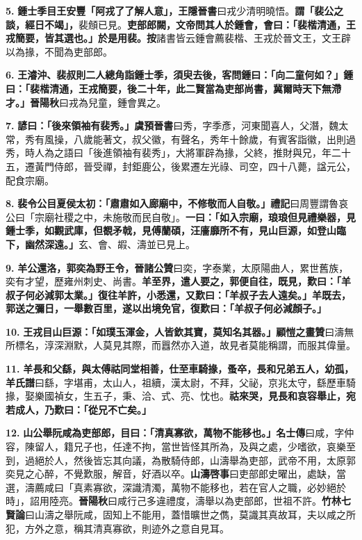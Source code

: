 \textbf{5.} \textbf{鍾士季目王安豐「阿戎了了解人意」，}{\footnotesize \textbf{王隱晉書}曰戎少清明曉悟。}\textbf{謂「裴公之談，經日不竭」，}{\footnotesize 裴頠已見。}\textbf{吏部郎闕，文帝問其人於鍾會，會曰：「裴楷清通，王戎簡要，皆其選也。」於是用裴。}{\footnotesize \textbf{按}諸書皆云鍾會薦裴楷、王戎於晉文王，文王辟以為掾，不聞為吏部郎。}

\textbf{6.} \textbf{王濬沖、裴叔則二人總角詣鍾士季，須臾去後，客問鍾曰：「向二童何如？」鍾曰：「裴楷清通，王戎簡要，後二十年，此二賢當為吏部尚書，冀爾時天下無滯才。」}{\footnotesize \textbf{晉陽秋}曰戎為兒童，鍾會異之。}

\textbf{7.} \textbf{諺曰：「後來領袖有裴秀。」}{\footnotesize \textbf{虞預晉書}曰秀，字季彥，河東聞喜人，父潛，魏太常，秀有風操，八歲能著文，叔父徽，有聲名，秀年十餘歲，有賓客詣徽，出則過秀，時人為之語曰「後進領袖有裴秀」，大將軍辟為掾，父終，推財與兄，年二十五，遷黃門侍郎，晉受禪，封鉅鹿公，後累遷左光祿、司空，四十八薨，諡元公，配食宗廟。}

\textbf{8.} \textbf{裴令公目夏侯太初：「肅肅如入廊廟中，不修敬而人自敬。」}{\footnotesize \textbf{禮記}曰周豐謂魯哀公曰「宗廟社稷之中，未施敬而民自敬」。}\textbf{一曰：「如入宗廟，琅琅但見禮樂器，見鍾士季，如觀武庫，但覩矛戟，見傅蘭碩，汪廧靡所不有，見山巨源，如登山臨下，幽然深遠。」}{\footnotesize 玄、會、嘏、濤並已見上。}

\textbf{9.} \textbf{羊公還洛，郭奕為野王令，}{\footnotesize \textbf{晉諸公贊}曰奕，字泰業，太原陽曲人，累世舊族，奕有才望，歷雍州刺史、尚書。}\textbf{羊至界，遣人要之，郭便自往，既見，歎曰：「羊叔子何必減郭太業。」復往羊許，小悉還，又歎曰：「羊叔子去人遠矣。」羊既去，郭送之彌日，一舉數百里，遂以出境免官，復歎曰：「羊叔子何必減顏子。」}

\textbf{10.} \textbf{王戎目山巨源：「如璞玉渾金，人皆欽其寶，莫知名其器。」}{\footnotesize \textbf{顧愷之畫贊}曰濤無所標名，淳深淵默，人莫見其際，而囂然亦入道，故見者莫能稱謂，而服其偉量。}

\textbf{11.} \textbf{羊長和父繇，與太傅祜同堂相善，仕至車騎掾，蚤卒，長和兄弟五人，幼孤，}{\footnotesize \textbf{羊氏譜}曰繇，字堪甫，太山人，祖續，漢太尉，不拜，父祕，京兆太守，繇歷車騎掾，娶樂國禎女，生五子，秉、洽、式、亮、忱也。}\textbf{祜來哭，見長和哀容舉止，宛若成人，乃歎曰：「從兄不亡矣。」}

\textbf{12.} \textbf{山公舉阮咸為吏部郎，目曰：「清真寡欲，萬物不能移也。」}{\footnotesize \textbf{名士傳}曰咸，字仲容，陳留人，籍兄子也，任達不拘，當世皆怪其所為，及與之處，少嗜欲，哀樂至到，過絕於人，然後皆忘其向議，為散騎侍郎，山濤舉為吏部，武帝不用，太原郭奕見之心醉，不覺歎服，解音，好酒以卒。\textbf{山濤啓事}曰吏部郎史曜出，處缺，當選，濤薦咸曰「真素寡欲，深識清濁，萬物不能移也，若在官人之職，必妙絕於時」，詔用陸亮。\textbf{晉陽秋}曰咸行己多違禮度，濤舉以為吏部郎，世祖不許。\textbf{竹林七賢論}曰山濤之舉阮咸，固知上不能用，蓋惜曠世之儁，莫識其真故耳，夫以咸之所犯，方外之意，稱其清真寡欲，則迹外之意自見耳。}

